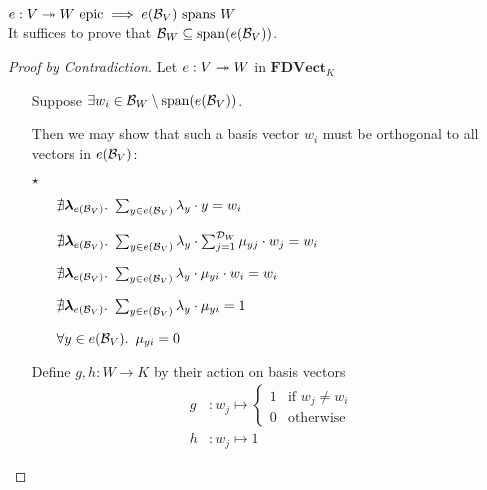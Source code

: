 \begin{lemma}\label{lemma:linear-map-epic-span}
  $e : V\twoheadrightarrow W \text{ epic} \implies e(\mathcal{B}_{V}) \text{ spans } W$\\[1em]
  It suffices to prove that $\mathcal{B}_{W} \subseteq \operatorname{span}(e(\mathcal{B}_{V}))$.

  \begin{proof}[Proof by Contradiction]
    Let $e : V \twoheadrightarrow W$ in $\mathbf{FDVect}_K$
    \begin{itemize}
      \item[\phantom{\imps}]
        Suppose ${\exists w_i\in\mathcal{B}_{W}\setminus\operatorname{span}(e(\mathcal{B}_{V}))}$.
        \marginnote{\Hyp}

      \item[\phantom{\imps}] Then we may show that such a basis vector $w_i$ must be orthogonal to all vectors in $e(\mathcal{B}_{V})$:

      \item[$\star$]
        \begin{itemize}
          \item[\phantom{\imps}]
            $\nexists \boldsymbol{\lambda}_{e(\mathcal{B}_{V})}\ldotp~\sum_{y\in e(\mathcal{B}_{V})} \lambda_y\cdot y = w_i$

          \item[\iffs]
            $\nexists \boldsymbol{\lambda}_{e(\mathcal{B}_{V})}\ldotp~\sum_{y\in e(\mathcal{B}_{V})} \lambda_y\cdot\sum_{j=1}^{\mathcal{D}_{W}}\mu_{yj}\cdot w_j = w_i$

          \item[\iffs]
            $\nexists \boldsymbol{\lambda}_{e(\mathcal{B}_{V})}\ldotp~\sum_{y\in e(\mathcal{B}_{V})} \lambda_y\cdot\mu_{yi}\cdot w_i = w_i$

          \item[\iffs]
            $\nexists \boldsymbol{\lambda}_{e(\mathcal{B}_{V})}\ldotp~\sum_{y\in e(\mathcal{B}_{V})} \lambda_y\cdot\mu_{yi} = 1$

          \item[\iffs]
            $\forall y \in e(\mathcal{B}_{V})\ldotp~\mu_{yi} = 0$
        \end{itemize}


      \item[\phantom{\imps}]
        Define $g, h : W\to K$ by their action on basis vectors
        \begin{align*}
          g & : w_j \mapsto
          \begin{cases}
            1 & \text{if }w_j \neq w_i\\
            0 & \text{otherwise}
          \end{cases}\\
          h & : w_j \mapsto 1
        \end{align*}


\end{itemize}
\end{proof}
\end{lemma}
